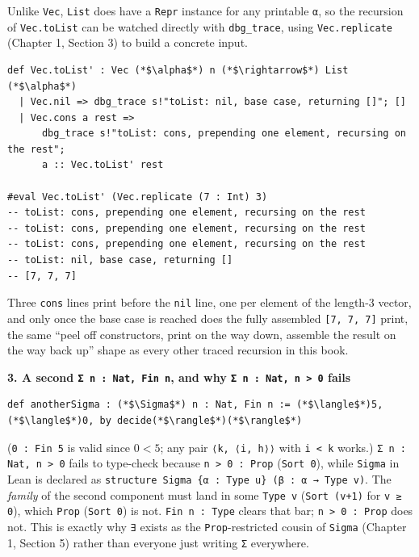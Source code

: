 Unlike \texttt{Vec}, \texttt{List} does have a \texttt{Repr} instance for any printable \texttt{α}, so the recursion of \texttt{Vec.toList} can be watched directly with \texttt{dbg\_\allowbreak{}trace}, using \texttt{Vec.replicate} (Chapter 1, Section 3) to build a concrete input.

\begin{lstlisting}
def Vec.toList' : Vec (*$\alpha$*) n (*$\rightarrow$*) List (*$\alpha$*)
  | Vec.nil => dbg_trace s!"toList: nil, base case, returning []"; []
  | Vec.cons a rest =>
      dbg_trace s!"toList: cons, prepending one element, recursing on the rest";
      a :: Vec.toList' rest

#eval Vec.toList' (Vec.replicate (7 : Int) 3)
-- toList: cons, prepending one element, recursing on the rest
-- toList: cons, prepending one element, recursing on the rest
-- toList: cons, prepending one element, recursing on the rest
-- toList: nil, base case, returning []
-- [7, 7, 7]
\end{lstlisting}

Three \texttt{cons} lines print before the \texttt{nil} line, one per element of the length-3 vector, and only once the base case is reached does the fully assembled \texttt{[7, 7, 7]} print, the same ``peel off constructors, print on the way down, assemble the result on the way back up'' shape as every other traced recursion in this book.

\textbf{3. A second \texttt{Σ n : Nat, Fin n}, and why \texttt{Σ n : Nat, n > 0} fails}

\begin{lstlisting}
def anotherSigma : (*$\Sigma$*) n : Nat, Fin n := (*$\langle$*)5, (*$\langle$*)0, by decide(*$\rangle$*)(*$\rangle$*)
\end{lstlisting}

(\texttt{0 : Fin 5} is valid since \(0 < 5\); any pair \texttt{⟨k, ⟨i, h⟩⟩} with \texttt{i < k} works.) \texttt{Σ n : Nat, n > 0} fails to type-check because \texttt{n > 0 : Prop} (\texttt{Sort 0}), while \texttt{Sigma} in Lean is declared as \texttt{structure Sigma \{α : Type u\} (β : α → Type v)}. The \emph{family} of the second component must land in some \texttt{Type v} (\texttt{Sort (v+1)} for \texttt{v ≥ 0}), which \texttt{Prop} (\texttt{Sort 0}) is not. \texttt{Fin n : Type} clears that bar; \texttt{n > 0 : Prop} does not. This is exactly why \texttt{∃} exists as the \texttt{Prop}-restricted cousin of \texttt{Sigma} (Chapter 1, Section 5) rather than everyone just writing \texttt{Σ} everywhere.

